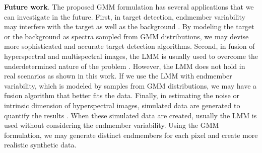 \documentclass[twocolumn,english]{IEEEtran}
\theoremstyle{plain}
\begin{document}
\textbf{Future work}. The proposed GMM formulation has several applications
that we can investigate in the future. First, in target detection,
endmember variability may interfere with the target as well as the
background \cite{jiao2015functions}. By modeling the target or the
background as spectra sampled from GMM distributions, we may devise
more sophisticated and accurate target detection algorithms. Second,
in fusion of hyperspectral and multispectral images, the LMM is usually
used to overcome the underdetermined nature of the problem \cite{yokoya2012coupled,wei2015fast}.
However, the LMM does not hold in real scenarios as shown in this
work. If we use the LMM with endmember variability, which is modeled
by samples from GMM distributions, we may have a fusion algorithm
that better fits the data. Finally, in estimating the noise or intrinsic
dimension of hyperspectral images, simulated data are generated to
quantify the results \cite{gao2013comparative}. When these simulated
data are created, usually the LMM is used without considering the
endmember variability. Using the GMM formulation, we may generate
distinct endmembers for each pixel and create more realistic synthetic
data.

\appendices{}
\end{document}
